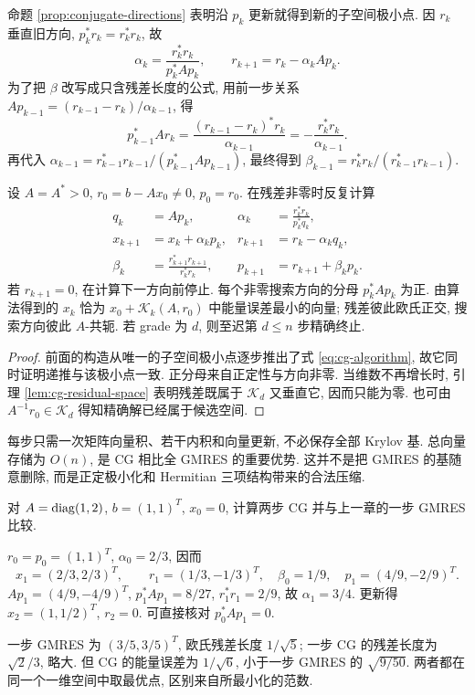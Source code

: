 命题 \ref{prop:conjugate-directions} 表明沿 $p_k$ 更新就得到新的子空间极小点. 因 $r_k$ 垂直旧方向,
$p_k^*r_k=r_k^*r_k$, 故
\[
\alpha_k=\frac{r_k^*r_k}{p_k^*Ap_k},\qquad
r_{k+1}=r_k-\alpha_kAp_k.
\]
为了把 $\beta$ 改写成只含残差长度的公式, 用前一步关系
$Ap_{k-1}=(r_{k-1}-r_k)/\alpha_{k-1}$, 得
\[
p_{k-1}^*Ar_k
=\frac{(r_{k-1}-r_k)^*r_k}{\alpha_{k-1}}
=-\frac{r_k^*r_k}{\alpha_{k-1}}.
\]
再代入 $\alpha_{k-1}=r_{k-1}^*r_{k-1}/(p_{k-1}^*Ap_{k-1})$, 最终得到
$\beta_{k-1}=r_k^*r_k/(r_{k-1}^*r_{k-1})$.

\begin{theorem}[CG 算法及其精确性质]\label{thm:cg-algorithm}
设 $A=A^*>0$, $r_0=b-Ax_0\ne0$, $p_0=r_0$. 在残差非零时反复计算
\begin{equation}\label{eq:cg-algorithm}
\begin{aligned}
q_k&=Ap_k,&\alpha_k&=\frac{r_k^*r_k}{p_k^*q_k},\\
x_{k+1}&=x_k+\alpha_kp_k,&r_{k+1}&=r_k-\alpha_kq_k,\\
\beta_k&=\frac{r_{k+1}^*r_{k+1}}{r_k^*r_k},&
p_{k+1}&=r_{k+1}+\beta_kp_k.
\end{aligned}
\end{equation}
若 $r_{k+1}=0$, 在计算下一方向前停止. 每个非零搜索方向的分母 $p_k^*Ap_k$ 为正. 由算法得到的 $x_k$ 恰为 $x_0+\mathcal K_k(A,r_0)$ 中能量误差最小的向量; 残差彼此欧氏正交, 搜索方向彼此 $A$-共轭. 若 grade 为 $d$, 则至迟第 $d\le n$ 步精确终止.
\end{theorem}
\begin{proof}
前面的构造从唯一的子空间极小点逐步推出了式 \eqref{eq:cg-algorithm}, 故它同时证明递推与该极小点一致. 正分母来自正定性与方向非零. 当维数不再增长时, 引理 \ref{lem:cg-residual-space} 表明残差既属于 $\mathcal K_d$ 又垂直它, 因而只能为零. 也可由 $A^{-1}r_0\in\mathcal K_d$ 得知精确解已经属于候选空间.
\end{proof}
每步只需一次矩阵向量积、若干内积和向量更新, 不必保存全部 Krylov 基. 总向量存储为 $O(n)$, 是 CG 相比全 GMRES 的重要优势. 这并不是把 GMRES 的基随意删除, 而是正定极小化和 Hermitian 三项结构带来的合法压缩.

\begin{example}
对 $A=\operatorname{diag}(1,2)$, $b=(1,1)^T$, $x_0=0$, 计算两步 CG 并与上一章的一步 GMRES 比较.
\end{example}
\begin{solution}
$r_0=p_0=(1,1)^T$, $\alpha_0=2/3$, 因而
\[
x_1=(2/3,2/3)^T,\qquad r_1=(1/3,-1/3)^T,
\quad\beta_0=1/9,\quad p_1=(4/9,-2/9)^T.
\]
$Ap_1=(4/9,-4/9)^T$, $p_1^*Ap_1=8/27$, $r_1^*r_1=2/9$, 故 $\alpha_1=3/4$. 更新得 $x_2=(1,1/2)^T$, $r_2=0$. 可直接核对 $p_0^*Ap_1=0$.

一步 GMRES 为 $(3/5,3/5)^T$, 欧氏残差长度 $1/\sqrt5$; 一步 CG 的残差长度为 $\sqrt2/3$, 略大. 但 CG 的能量误差为 $1/\sqrt6$, 小于一步 GMRES 的 $\sqrt{9/50}$. 两者都在同一个一维空间中取最优点, 区别来自所最小化的范数.
\end{solution}

